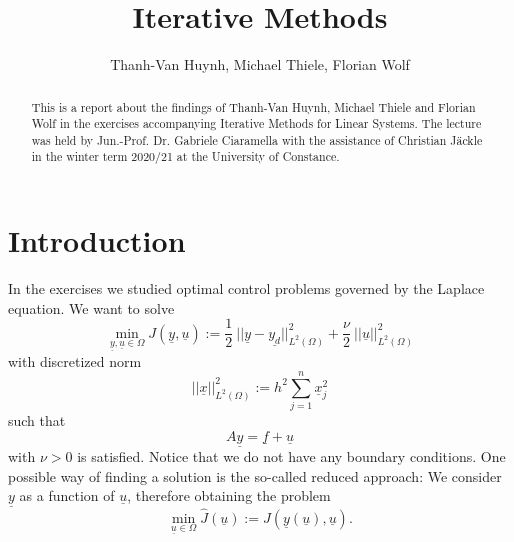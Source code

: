\documentclass{amsart}
\theoremstyle{definition}
\theoremstyle{remark}
\numberwithin{equation}{section}
\begin{document}
\title{Iterative Methods}

\author{Thanh-Van Huynh, Michael Thiele, Florian Wolf}


\begin{abstract}
	This is a report about the findings of Thanh-Van Huynh, Michael Thiele and Florian Wolf in the exercises accompanying Iterative Methods for Linear Systems. The lecture was held by Jun.-Prof. Dr. Gabriele Ciaramella with the assistance of Christian J\"ackle in the winter term 2020/21 at the University of Constance.
\end{abstract}

\maketitle

\tableofcontents



\section{Introduction}
In the exercises we studied optimal control problems governed by the Laplace equation. We want to solve
\begin{equation*}
\min\limits_{\underline{y},\underline{u}\in\Omega} J(\underline{y},\underline{u}) := \frac{1}{2}\ ||\underline{y}-\underline{y_d}||_{L^2(\Omega)}^2 + \frac{\nu}{2}\ ||\underline{u}||_{L^2(\Omega)}^2
\end{equation*}
with discretized norm
\begin{equation*}
||\underline{x}||_{L^2(\Omega)}^2 := h^2 \sum\limits_{j=1}^n \underline{x}_j^2
\end{equation*}
such that
\begin{equation*}
A\underline{y}=\underline{f}+\underline{u}
\end{equation*}
with $\nu>0$ is satisfied. Notice that we do not have any boundary conditions. One possible way of finding a solution is the so-called reduced approach: We consider $\underline{y}$ as a function of $\underline{u}$, therefore obtaining the problem
\begin{equation*}
\min\limits_{\underline{u}\in\Omega} \hat{J}(\underline{u}) := J(\underline{y}(\underline{u}),\underline{u}).
\end{equation*}
\end{document}
